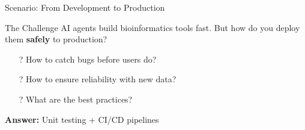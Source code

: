\documentclass[aspectratio=169]{beamer}
\begin{document}
\begin{frame}{Scenario: From Development to Production}
  \begin{block}{The Challenge}
    AI agents build bioinformatics tools fast. But how do you deploy them \textbf{safely} to production?
  \end{block}

  \vspace{0.4cm}
  \begin{itemize}
    \item[?] How to catch bugs before users do?
    \item[?] How to ensure reliability with new data?
    \item[?] What are the best practices?
  \end{itemize}

  \vspace{0.5cm}
  \begin{center}
    \textcolor{conesaTeal}{\textbf{Answer:} Unit testing + CI/CD pipelines}
  \end{center}
\end{frame}
\end{document}
